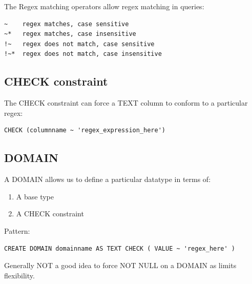 \documentclass[slides]{pgnotes}
\begin{document}
The Regex matching operators allow regex matching in queries:

\begin{verbatim}
~    regex matches, case sensitive
~*   regex matches, case insensitive
!~   regex does not match, case sensitive
!~*  regex does not match, case insensitive
\end{verbatim}

\subsection{CHECK constraint}\label{check-constraint}

The CHECK constraint can force a TEXT column to conform to a particular regex:

\begin{verbatim}
CHECK (columnname ~ 'regex_expression_here')
\end{verbatim}

\subsection{DOMAIN}\label{domain}

A DOMAIN allows us to define a particular datatype in terms of:

\begin{enumerate}
\def\labelenumi{\arabic{enumi}.}
\tightlist
\item
  A base type
\item
  A CHECK constraint
\end{enumerate}

Pattern:

\begin{verbatim}
CREATE DOMAIN domainname AS TEXT CHECK ( VALUE ~ 'regex_here' )
\end{verbatim}

Generally NOT a good idea to force NOT NULL on a DOMAIN as limits
flexibility.
\end{document}
